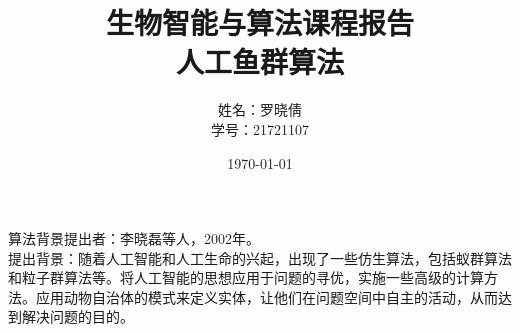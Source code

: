 \documentclass[a4paper, 11pt]{article}
\begin{document}
\title{生物智能与算法课程报告\\人工鱼群算法}
\author{姓名：罗晓倩\\学号：21721107}
\date{\today}
\maketitle
\tableofcontents
\newpage
\begin{section}
	{算法背景}提出者：李晓磊等人，2002年。\\提出背景：随着人工智能和人工生命的兴起，出现了一些仿生算法，包括蚁群算法和粒子群算法等。将人工智能的思想应用于问题的寻优，实施一些高级的计算方法。应用动物自治体的模式来定义实体，让他们在问题空间中自主的活动，从而达到解决问题的目的。
\end{section}
\end{document}
